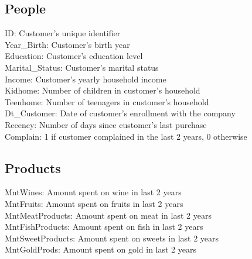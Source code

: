 \documentclass[12pt,a4paper]{report}
\begin{document}
\subsection{People}
\begin{itemize}
\vspace{0.2cm}
ID: Customer's unique identifier\\
\vspace{0.2cm}
Year\_Birth: Customer's birth year\\
\vspace{0.2cm}
Education: Customer's education level\\
\vspace{0.2cm}
Marital\_Status: Customer's marital status\\
\vspace{0.2cm}
Income: Customer's yearly household income\\
\vspace{0.2cm}
Kidhome: Number of children in customer's household\\
\vspace{0.2cm}
Teenhome: Number of teenagers in customer's household\\
\vspace{0.2cm}
Dt\_Customer: Date of customer's enrollment with the company\\
\vspace{0.2cm}
Recency: Number of days since customer's last purchase\\
\vspace{0.2cm}
Complain: 1 if customer complained in the last 2 years, 0 otherwise\\
\vspace{0.2cm}
\end{itemize}

\subsection{Products}
\begin{itemize}
\vspace{0.2cm}
MntWines: Amount spent on wine in last 2 years\\
\vspace{0.2cm}
MntFruits: Amount spent on fruits in last 2 years\\
\vspace{0.2cm}
MntMeatProducts: Amount spent on meat in last 2 years\\
\vspace{0.2cm}
MntFishProducts: Amount spent on fish in last 2 years\\
\vspace{0.2cm}
MntSweetProducts: Amount spent on sweets in last 2 years\\
\vspace{0.2cm}
MntGoldProds: Amount spent on gold in last 2 years\\
\vspace{0.2cm}

\end{itemize}
\end{document}
